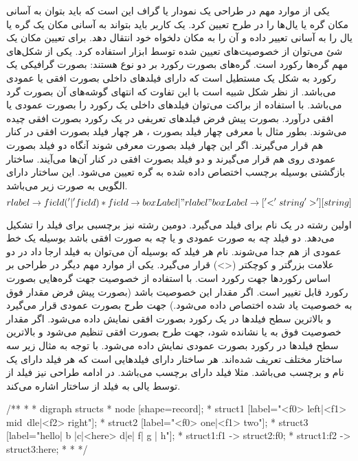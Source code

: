 یکی از موارد مهم در طراحی یک نمودار یا گراف این است که باید بتوان به آسانی مکان گره یا یال‌ها را در طرح تعیین کرد. یک کاربر باید بتواند به آسانی مکان یک گره یا یال را به آسانی تعییر داده و آن را به مکان دلخواه خود انتقال دهد. برای تعیین مکان یک شئ می‌توان از خصوصیت‌های تعیین شده توسط ابزار  استفاده کرد.
یکی از شکل‌های مهم گره‌ها رکورد است. گره‌های بصورت رکورد بر دو نوع هستند:
بصورت گرافیکی یک رکورد به شکل یک مستطیل است که دارای فیلدهای داخلی بصورت افقی یا عمودی می‌باشد.  از نظر شکل شبیه  است با این تفاوت که  انتهای گوشه‌های آن بصورت گرد می‌باشد. با استفاده از براکت‌ {} می‌توان فیلدهای داخلی یک رکورد را بصورت عمودی یا افقی درآورد. بصورت پیش فرض فیلدهای تعریفی در یک رکورد بصورت افقی چیده می‌شوند. بطور مثال با معرفی چهار فیلد بصورت  ، هر چهار فیلد بصورت افقی در کنار هم قرار می‌گیرند. اگر این چهار فیلد بصورت  معرفی شوند آنگاه دو فیلد  بصورت عمودی روی هم قرار می‌گیرند و دو فیلد  بصورت افقی در کنار آن‌ها می‌آیند.
ساختار بازگشتی بوسیله برچسب اختصاص داده شده به گره تعیین می‌شود. این ساختار دارای الگویی به صورت زیر می‌باشد.
\begin{equation}
 rlabel \rightarrow field('|'field)*
 field  \rightarrow boxLabel|"rlabel"
 boxLabel \rightarrow ['<'string'>'][string]
\end{equation}

اولین رشته در  یک نام برای فیلد می‌گیرد. دومین رشته نیز برچسبی برای فیلد را تشکیل می‌دهد. دو فیلد چه به صورت عمودی و یا چه به صورت افقی باشد بوسیله یک خط عمودی از هم جدا می‌شوند. نام هر فیلد که بوسیله آن می‌توان به فیلد ارجا داد در دو علامت بزرگتر و کوچکتر (<>) قرار می‌گیرد.
یکی از موارد مهم دیگر در طراحی بر اساس رکوردها جهت رکورد است. با استفاده از خصوصیت  جهت گره‌هایی بصورت رکورد قابل تغییر است. اگر مقدار این خصوصیت  باشد (بصورت پیش فرض مقدار فوق به خصوصیت یاد شده اختصاص داده می‌شود.) جهت طرح بصورت عمودی قرار می‌گیرد و بالاترین سطح فیلدها در یک رکورد بصورت افقی نمایش داده می‌شود.
اگر مقدار خصوصیت فوق به  یا  نشانده شود، جهت طرح بصورت افقی تنظیم می‌شود و بالاترین سطح فیلدها در رکورد بصورت عمودی نمایش داده می‌شود.
با توجه به مثال زیر سه ساختار مختلف تعریف شده‌اند. هر ساختار دارای فیلدهایی است که هر فیلد دارای یک نام و برچسب می‌باشد. مثلا فیلد  دارای برچسب  می‌باشد. در ادامه طراحی نیز فیلد  از  توسط یالی به فیلد  از ساختار  اشاره می‌کند.
\begin{C++}
/**
* \dot
* digraph structs { 
* node [shape=record];
* struct1 [label="<f0> left|<f1> mid\ dle|<f2> right"];
* struct2 [label="<f0> one|<f1> two"];
* struct3 [label="hello\nworld |{ b |{c|<here> d|e}| f}| g | h"];
* struct1:f1 -> struct2:f0;
* struct1:f2 -> struct3:here;
* }
* \enddot
*/
\end{C++}


